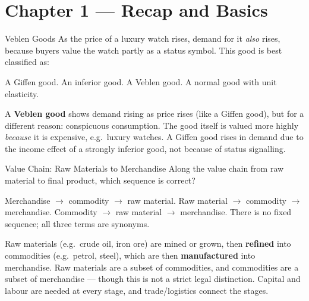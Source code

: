 \section{Chapter 1 — Recap and Basics}

\begin{question}[type=mc]{Veblen Goods}
As the price of a luxury watch rises, demand for it \emph{also} rises, because
buyers value the watch partly as a status symbol. This good is best classified
as:
\begin{choices}
  \choice        A Giffen good.
  \choice        An inferior good.
  \correctchoice A Veblen good.
  \choice        A normal good with unit elasticity.
\end{choices}
\begin{solution}
  A \textbf{Veblen good} shows demand rising as price rises (like a Giffen
  good), but for a different reason: conspicuous consumption. The good itself
  is valued more highly \emph{because} it is expensive, e.g.\ luxury watches.
  A Giffen good rises in demand due to the income effect of a strongly
  inferior good, not because of status signalling.
\end{solution}
\end{question}

\begin{question}[type=mc]{Value Chain: Raw Materials to Merchandise}
Along the value chain from raw material to final product, which sequence is
correct?
\begin{choices}
  \choice        Merchandise $\to$ commodity $\to$ raw material.
  \correctchoice Raw material $\to$ commodity $\to$ merchandise.
  \choice        Commodity $\to$ raw material $\to$ merchandise.
  \choice        There is no fixed sequence; all three terms are synonyms.
\end{choices}
\begin{solution}
  Raw materials (e.g.\ crude oil, iron ore) are mined or grown, then
  \textbf{refined} into commodities (e.g.\ petrol, steel), which are then
  \textbf{manufactured} into merchandise. Raw materials are a subset of
  commodities, and commodities are a subset of merchandise — though this is
  not a strict legal distinction. Capital and labour are needed at every
  stage, and trade/logistics connect the stages.
\end{solution}
\end{question}

